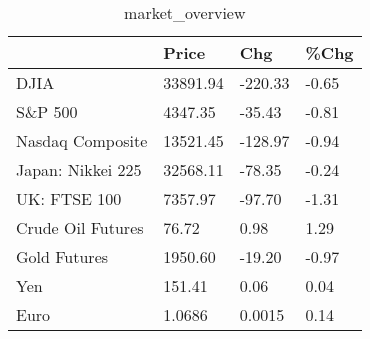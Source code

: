 \documentclass{article}%
\begin{document}
%


\begin{table}[htbp]%
\caption{market\_overview}%
\centering%
\begin{adjustbox}{width=1\textwidth}%
\begin{tabular}{llll}
\toprule
                  &    Price &     Chg &  \%Chg \\
\midrule
             DJIA & 33891.94 & -220.33 & -0.65 \\
          S\&P 500 &  4347.35 &  -35.43 & -0.81 \\
 Nasdaq Composite & 13521.45 & -128.97 & -0.94 \\
Japan: Nikkei 225 & 32568.11 &  -78.35 & -0.24 \\
     UK: FTSE 100 &  7357.97 &  -97.70 & -1.31 \\
Crude Oil Futures &    76.72 &    0.98 &  1.29 \\
     Gold Futures &  1950.60 &  -19.20 & -0.97 \\
              Yen &   151.41 &    0.06 &  0.04 \\
             Euro &   1.0686 &  0.0015 &  0.14 \\
\bottomrule
\end{tabular}
%
\end{adjustbox}%
\end{table}

%
\end{document}
